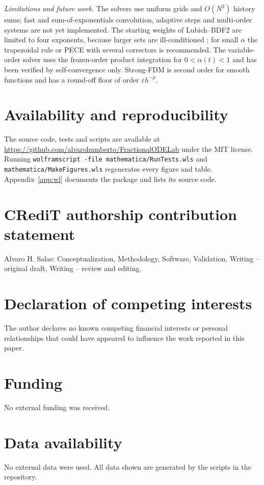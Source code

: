 \documentclass[11pt]{article}
\begin{document}
\textit{Limitations and future work.} The solvers use uniform grids and $O(N^2)$ history sums; fast and sum-of-exponentials convolution, adaptive steps and multi-order systems are not yet implemented. The starting weights of Lubich--BDF2 are limited to four exponents, because larger sets are ill-conditioned \cite{dff2006}; for small $\alpha$ the trapezoidal rule or PECE with several correctors is recommended. The variable-order solver uses the frozen-order product integration for $0<\alpha(t)<1$ and has been verified by self-convergence only. Strong-FDM is second order for smooth functions and has a round-off floor of order $\varepsilon h^{-p}$.

\section*{Availability and reproducibility}
The source code, tests and scripts are available at \url{https://github.com/alvarohumberto/FractionalODELab} under the MIT license. Running \texttt{wolframscript -file mathematica/RunTests.wls} and \texttt{mathematica/MakeFigures.wls} regenerates every figure and table. Appendix~\ref{app:wl} documents the package and lists its source code.
\section*{CRediT authorship contribution statement}
Alvaro H. Salas: Conceptualization, Methodology, Software, Validation, Writing -- original draft, Writing -- review and editing.
\section*{Declaration of competing interests}
The author declares no known competing financial interests or personal relationships that could have appeared to influence the work reported in this paper.
\section*{Funding}
No external funding was received.
\section*{Data availability}
No external data were used. All data shown are generated by the scripts in the repository.
\end{document}
